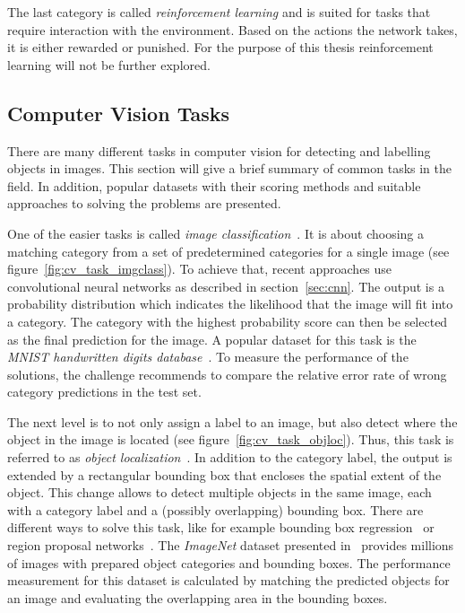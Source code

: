 The last category is called \emph{reinforcement learning} and is suited for tasks that require interaction with the environment. Based on the actions the network takes, it is either rewarded or punished. For the purpose of this thesis reinforcement learning will not be further explored.

\subsection{Computer Vision Tasks}
There are many different tasks in computer vision for detecting and labelling objects in images. This section will give a brief summary of common tasks in the field. In addition, popular datasets with their scoring methods and suitable approaches to solving the problems are presented.

One of the easier tasks is called \emph{image classification}~\cite[p.~98]{DLbook16}. It is about choosing a matching category from a set of predetermined categories for a single image (see figure~\ref{fig:cv_task_imgclass}). To achieve that, recent approaches use convolutional neural networks as described in section~\ref{sec:cnn}. The output is a probability distribution which indicates the likelihood that the image will fit into a category. The category with the highest probability score can then be selected as the final prediction for the image. A popular dataset for this task is the \emph{MNIST handwritten digits database}~\cite{mnist10}. To measure the performance of the solutions, the challenge recommends to compare the relative error rate of wrong category predictions in the test set.

The next level is to not only assign a label to an image, but also detect where the object in the image is located (see figure~\ref{fig:cv_task_objloc}). Thus, this task is referred to as \emph{object localization}~\cite{rcnn14}. In addition to the category label, the output is extended by a rectangular bounding box that encloses the spatial extent of the object. This change allows to detect multiple objects in the same image, each with a category label and a (possibly overlapping) bounding box. There are different ways to solve this task, like for example bounding box regression~\cite{obj_detection13} or region proposal networks~\cite{ff-rcnn14}. The \emph{ImageNet} dataset presented in~\cite{imgnet09} provides millions of images with prepared object categories and bounding boxes. The performance measurement for this dataset is calculated by matching the predicted objects for an image and evaluating the overlapping area in the bounding boxes.

